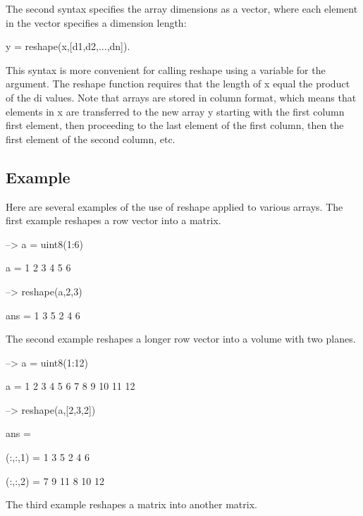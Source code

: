 The second syntax specifies the array dimensions as a vector, where each element in the vector specifies a dimension length\-: \begin{DoxyVerb}   y = reshape(x,[d1,d2,...,dn]).
\end{DoxyVerb}
 This syntax is more convenient for calling {\ttfamily reshape} using a variable for the argument. The {\ttfamily reshape} function requires that the length of {\ttfamily x} equal the product of the {\ttfamily di} values. Note that arrays are stored in column format, which means that elements in {\ttfamily x} are transferred to the new array {\ttfamily y} starting with the first column first element, then proceeding to the last element of the first column, then the first element of the second column, etc. \hypertarget{variables_struct_Example}{}\subsection{Example}\label{variables_struct_Example}
Here are several examples of the use of {\ttfamily reshape} applied to various arrays. The first example reshapes a row vector into a matrix.


\begin{DoxyVerbInclude}
--> a = uint8(1:6)

a = 
 1 2 3 4 5 6 

--> reshape(a,2,3)

ans = 
 1 3 5 
 2 4 6 
\end{DoxyVerbInclude}


The second example reshapes a longer row vector into a volume with two planes.


\begin{DoxyVerbInclude}
--> a = uint8(1:12)

a = 
  1  2  3  4  5  6  7  8  9 10 11 12 

--> reshape(a,[2,3,2])

ans = 

(:,:,1) = 
  1  3  5 
  2  4  6 

(:,:,2) = 
  7  9 11 
  8 10 12 
\end{DoxyVerbInclude}


The third example reshapes a matrix into another matrix.


